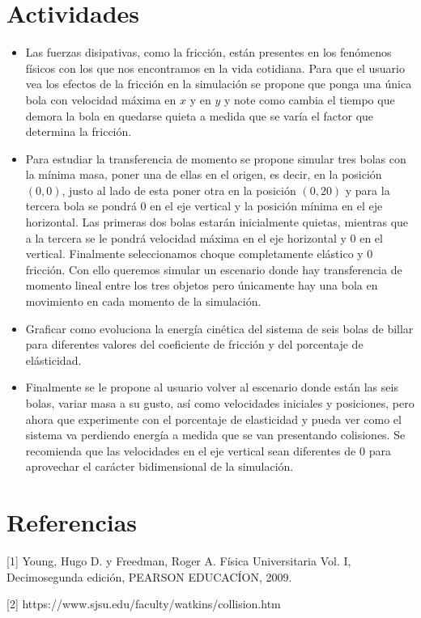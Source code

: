 \documentclass{article}
\begin{document}
\section{Actividades}
\begin{itemize} 
\item Las fuerzas disipativas, como la fricción, están presentes en los fenómenos físicos con los que nos encontramos en la vida cotidiana. Para que el usuario vea los efectos de la fricción en la simulación se propone que ponga una única bola con velocidad máxima en $x$ y en $y$ y note como cambia el tiempo que demora la bola en quedarse quieta a medida que se varía el factor que determina la fricción.
\item Para estudiar la transferencia de momento se propone simular tres bolas con la mínima masa, poner una de ellas en el origen, es decir, en la posición $(0,0)$, justo al lado de esta poner otra en la posición $(0,20)$ y para la tercera bola se pondrá 0 en el eje vertical y la posición mínima en el eje horizontal. Las primeras dos bolas estarán inicialmente quietas, mientras que a la tercera se le pondrá velocidad máxima en el eje horizontal y 0 en el vertical. Finalmente seleccionamos choque completamente elástico y 0 fricción. Con ello queremos simular un escenario donde hay transferencia de momento lineal entre los tres objetos pero únicamente hay una bola en movimiento en cada momento de la simulación. 
\item Graficar como evoluciona la energía cinética del sistema de seis bolas de billar para diferentes valores del coeficiente de fricción y del porcentaje de elásticidad. 
\item Finalmente se le propone al usuario volver al escenario donde están las seis bolas, variar masa a su gusto, así como velocidades iniciales y posiciones, pero ahora que experimente con el porcentaje de elasticidad y pueda ver como el sistema va perdiendo energía a medida que se van presentando colisiones. Se recomienda que las velocidades en el eje vertical sean diferentes de 0 para aprovechar el carácter bidimensional de la simulación.
\end{itemize}
\section{Referencias}
[1] Young, Hugo D. y Freedman, Roger A. Física Universitaria Vol. I, Decimosegunda edición, PEARSON EDUCACÍON, 2009.

[2] https://www.sjsu.edu/faculty/watkins/collision.htm
\end{document}
